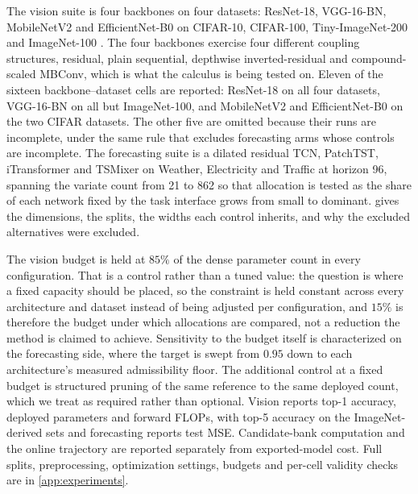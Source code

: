 \documentclass[10pt]{article}
\theoremstyle{paper}
\begin{document}
The vision suite is four backbones on four datasets: ResNet-18, VGG-16-BN, MobileNetV2 and EfficientNet-B0 \citep{he2016deep,simonyan2014very,sandler2018mobilenetv2,tan2019efficientnet} on CIFAR-10, CIFAR-100, Tiny-ImageNet-200 and ImageNet-100 \citep{krizhevsky2009learning,le2015tiny,5206848}. The four backbones exercise four different coupling structures, residual, plain sequential, depthwise inverted-residual and compound-scaled MBConv, which is what the calculus is being tested on. Eleven of the sixteen backbone--dataset cells are reported: ResNet-18 on all four datasets, VGG-16-BN on all but ImageNet-100, and MobileNetV2 and EfficientNet-B0 on the two CIFAR datasets. The other five are omitted because their runs are incomplete, under the same rule that excludes forecasting arms whose controls are incomplete. The forecasting suite is a dilated residual TCN, PatchTST, iTransformer and TSMixer \citep{bai2018empirical,nie2023a,liu2024itransformer,chen2023tsmixer} on Weather, Electricity and Traffic \citep{lai2018modeling,zhou2021informer} at horizon 96, spanning the variate count from 21 to 862 so that allocation is tested as the share of each network fixed by the task interface grows from small to dominant.  gives the dimensions, the splits, the widths each control inherits, and why the excluded alternatives were excluded.

The vision budget is held at $85\%$ of the dense parameter count in every configuration. That is a control rather than a tuned value: the question is where a fixed capacity should be placed, so the constraint is held constant across every architecture and dataset instead of being adjusted per configuration, and $15\%$ is therefore the budget under which allocations are compared, not a reduction the method is claimed to achieve. Sensitivity to the budget itself is characterized on the forecasting side, where the target is swept from $0.95$ down to each architecture's measured admissibility floor. The additional control at a fixed budget is structured pruning of the same reference to the same deployed count, which we treat as required rather than optional. Vision reports top-1 accuracy, deployed parameters and forward FLOPs, with top-5 accuracy on the ImageNet-derived sets and forecasting reports test MSE. Candidate-bank computation and the online trajectory are reported separately from exported-model cost. Full splits, preprocessing, optimization settings, budgets and per-cell validity checks are in \cref{app:experiments}.
\end{document}
